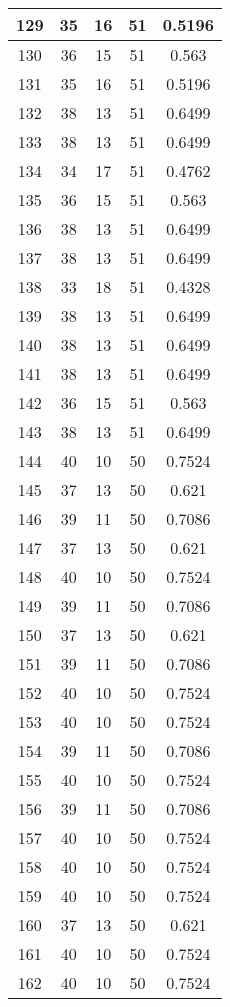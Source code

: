 \documentclass[letterpaper, 12pt]{article}
\begin{document}
\begin{longtable}{|c|c|c|c|c|}
\hline
129 & 35 & 16 & 51 & 0.5196 \\
\hline
130 & 36 & 15 & 51 & 0.563 \\
\hline
131 & 35 & 16 & 51 & 0.5196 \\
\hline
132 & 38 & 13 & 51 & 0.6499 \\
\hline
133 & 38 & 13 & 51 & 0.6499 \\
\hline
134 & 34 & 17 & 51 & 0.4762 \\
\hline
135 & 36 & 15 & 51 & 0.563 \\
\hline
136 & 38 & 13 & 51 & 0.6499 \\
\hline
137 & 38 & 13 & 51 & 0.6499 \\
\hline
138 & 33 & 18 & 51 & 0.4328 \\
\hline
139 & 38 & 13 & 51 & 0.6499 \\
\hline
140 & 38 & 13 & 51 & 0.6499 \\
\hline
141 & 38 & 13 & 51 & 0.6499 \\
\hline
142 & 36 & 15 & 51 & 0.563 \\
\hline
143 & 38 & 13 & 51 & 0.6499 \\
\hline
144 & 40 & 10 & 50 & 0.7524 \\
\hline
145 & 37 & 13 & 50 & 0.621 \\
\hline
146 & 39 & 11 & 50 & 0.7086 \\
\hline
147 & 37 & 13 & 50 & 0.621 \\
\hline
148 & 40 & 10 & 50 & 0.7524 \\
\hline
149 & 39 & 11 & 50 & 0.7086 \\
\hline
150 & 37 & 13 & 50 & 0.621 \\
\hline
151 & 39 & 11 & 50 & 0.7086 \\
\hline
152 & 40 & 10 & 50 & 0.7524 \\
\hline
153 & 40 & 10 & 50 & 0.7524 \\
\hline
154 & 39 & 11 & 50 & 0.7086 \\
\hline
155 & 40 & 10 & 50 & 0.7524 \\
\hline
156 & 39 & 11 & 50 & 0.7086 \\
\hline
157 & 40 & 10 & 50 & 0.7524 \\
\hline
158 & 40 & 10 & 50 & 0.7524 \\
\hline
159 & 40 & 10 & 50 & 0.7524 \\
\hline
160 & 37 & 13 & 50 & 0.621 \\
\hline
161 & 40 & 10 & 50 & 0.7524 \\
\hline
162 & 40 & 10 & 50 & 0.7524 \\

\end{longtable}
\end{document}
